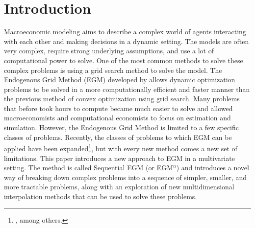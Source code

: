 \documentclass{article}
\begin{document}
\section{Introduction}\label{introduction}




Macroeconomic modeling aims to describe a complex world of agents interacting with each other and making decisions in a dynamic setting. The models are often very complex, require strong underlying assumptions, and use a lot of computational power to solve. One of the most common methods to solve these complex problems is using a grid search method to solve the model. The Endogenous Grid Method (EGM) developed by \citet{Carroll2006} allows dynamic optimization problems to be solved in a more computationally efficient and faster manner than the previous method of convex optimization using grid search. Many problems that before took hours to compute became much easier to solve and allowed macroeconomists and computational economists to focus on estimation and simulation.
However, the Endogenous Grid Method is limited to a few specific classes of problems. Recently, the classes of problems to which EGM can be applied have been expanded\footnote{\citet{Barillas2007, Maliar2013, Fella2014, White2015, Iskhakov2017}, among others.}, but with every new method comes a new set of limitations.
This paper introduces a new approach to EGM in a multivariate setting. The method is called Sequential EGM (or EGM$^n$) and introduces a novel way of breaking down complex problems into a sequence of simpler, smaller, and more tractable problems, along with an exploration of new multidimensional interpolation methods that can be used to solve these problems.
\end{document}
